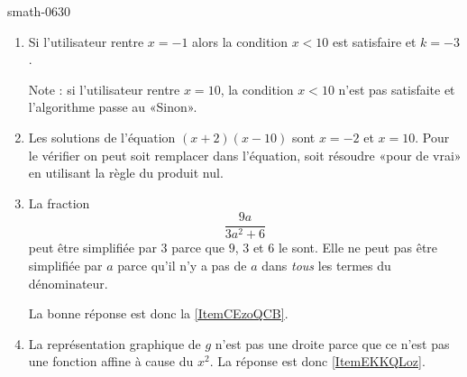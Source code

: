 
\begin{corrige}{smath-0630}

    \begin{enumerate}
        \item
            Si l'utilisateur rentre \( x=-1\) alors la condition \( x<10\) est satisfaire et \( k=-3\).

            Note : si l'utilisateur rentre \( x=10\), la condition \( x<10 \) n'est pas satisfaite et l'algorithme passe au «Sinon».
        \item
            Les solutions de l'équation \( (x+2)(x-10)\) sont \( x=-2\) et \( x=10\). Pour le vérifier on peut soit remplacer dans l'équation, soit résoudre «pour de vrai» en utilisant la règle du produit nul.
        \item
            La fraction
            \begin{equation}
                \frac{ 9a }{ 3a^2+6 }
            \end{equation}
            peut être simplifiée par \( 3\) parce que \( 9\), \( 3\) et \( 6\) le sont. Elle ne peut pas être simplifiée par \( a\) parce qu'il n'y a pas de \( a\) dans \emph{tous} les termes du dénominateur.

            La bonne réponse est donc la \ref{ItemCEzoQCB}.
        \item
            La représentation graphique de \( g\) n'est pas une droite parce que ce n'est pas une fonction affine à cause du \( x^2\). La réponse est donc \ref{ItemEKKQLoz}.

    \end{enumerate}
    

\end{corrige}
